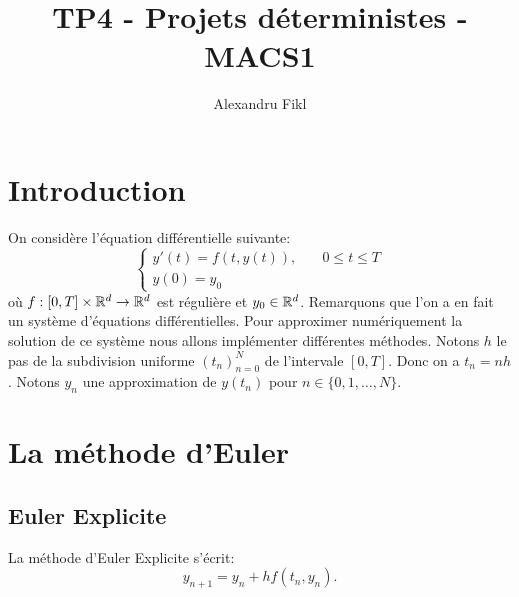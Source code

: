 \documentclass[a4paper,10pt]{article}
\title{TP4 - Projets déterministes - MACS1}
\author{Alexandru Fikl}
\begin{document}
\maketitle

\section{Introduction}

On considère l'équation différentielle suivante:
\begin{equation}\label{eq:eqdiff}
\left\{
\begin{array}{ll}
    y'(t) = f(t, y(t)), & \quad 0 \leq t \leq T \\
    y(0) = y_0 &
\end{array}
\right.
\end{equation}
où $f: [0, T] \times \mathbb{R}^d \to \mathbb{R}^d$ est régulière et $y_0 \in
\mathbb{R}^d$. Remarquons que l'on a en fait un système d'équations différentielles.
Pour approximer numériquement la solution de ce système nous allons implémenter
différentes méthodes. Notons $h$ le pas de la subdivision uniforme $(t_n)_{n = 0}^N$
de l'intervale $[0, T]$. Donc on a $t_n = nh$. Notons $y_n$ une approximation de
$y(t_n)$ pour $n \in \{0, 1, \dots, N\}$.

\section{La méthode d'Euler}
\subsection{Euler Explicite}

La méthode d'Euler Explicite s'écrit:
\begin{equation}\label{eq:eulerex}
    y_{n + 1} = y_n + h f(t_n, y_n).
\end{equation}
\end{document}
